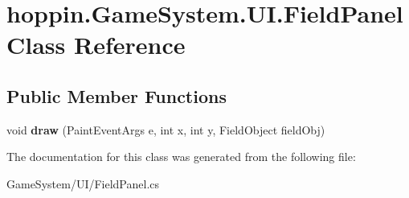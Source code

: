 \hypertarget{classhoppin_1_1_game_system_1_1_u_i_1_1_field_panel}{}\section{hoppin.\+Game\+System.\+U\+I.\+Field\+Panel Class Reference}
\label{classhoppin_1_1_game_system_1_1_u_i_1_1_field_panel}
\subsection*{Public Member Functions}
\begin{DoxyCompactItemize}
\item 
void {\bfseries draw} (Paint\+Event\+Args e, int x, int y, Field\+Object field\+Obj)\hypertarget{classhoppin_1_1_game_system_1_1_u_i_1_1_field_panel_aeec56d14d3f4c778ce3b5e1d1261a82b}{}\label{classhoppin_1_1_game_system_1_1_u_i_1_1_field_panel_aeec56d14d3f4c778ce3b5e1d1261a82b}

\end{DoxyCompactItemize}


The documentation for this class was generated from the following file\+:\begin{DoxyCompactItemize}
\item 
Game\+System/\+U\+I/Field\+Panel.\+cs\end{DoxyCompactItemize}
